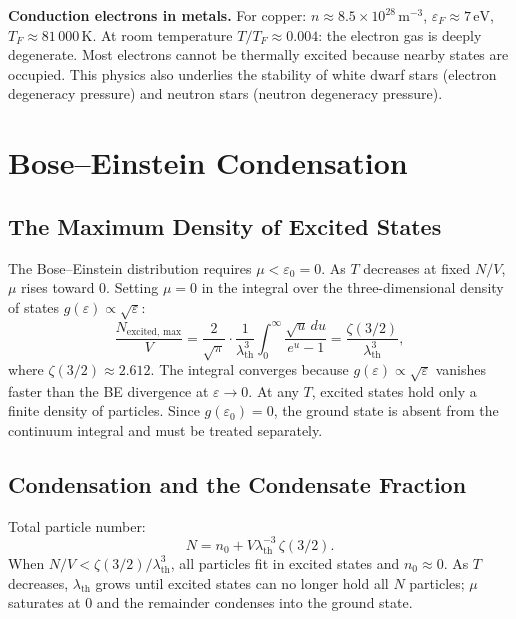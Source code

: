 \begin{fact}
\textbf{Conduction electrons in metals.}
For copper: $n \approx 8.5\times10^{28}\,\text{m}^{-3}$,
$\varepsilon_F \approx 7\,\text{eV}$, $T_F \approx 81\,000\,\text{K}$.
At room temperature $T/T_F \approx 0.004$: the electron gas is deeply degenerate.
Most electrons cannot be thermally excited because nearby states are occupied.
This physics also underlies the stability of white dwarf stars (electron degeneracy
pressure) and neutron stars (neutron degeneracy pressure).
\end{fact}

\section{Bose--Einstein Condensation}

\subsection{The Maximum Density of Excited States}

The Bose--Einstein distribution requires $\mu < \varepsilon_0 = 0$.  As $T$
decreases at fixed $N/V$, $\mu$ rises toward $0$.  Setting $\mu = 0$ in the
integral over the three-dimensional density of states $g(\varepsilon) \propto \sqrt{\varepsilon}$:
\begin{equation}
    \frac{N_\text{excited, max}}{V}
    = \frac{2}{\sqrt{\pi}}\cdot\frac{1}{\lambda_\text{th}^3}
      \int_0^\infty \frac{\sqrt{u}\,du}{e^u - 1}
    = \frac{\zeta(3/2)}{\lambda_\text{th}^3},
\end{equation}
where $\zeta(3/2) \approx 2.612$.  The integral converges because $g(\varepsilon)
\propto \sqrt{\varepsilon}$ vanishes faster than the BE divergence at $\varepsilon \to 0$.
At any $T$, excited states hold only a finite density of particles. Since $g(\varepsilon_0) = 0$, the ground state is absent from the continuum integral and must be treated separately.

\subsection{Condensation and the Condensate Fraction}

Total particle number:
\begin{equation}
    N = n_0 + V\lambda_\text{th}^{-3}\,\zeta(3/2).
\end{equation}
When $N/V < \zeta(3/2)/\lambda_\text{th}^3$, all particles fit in excited states
and $n_0 \approx 0$.  As $T$ decreases, $\lambda_\text{th}$ grows until excited
states can no longer hold all $N$ particles; $\mu$ saturates at $0$ and the
remainder condenses into the ground state.

